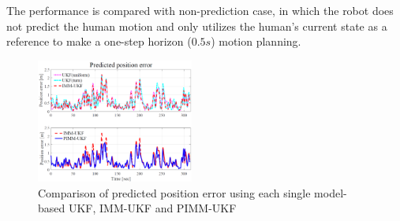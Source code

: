 \documentclass[journal]{IEEEtran}
\begin{document}
	The performance is compared with non-prediction case, in which the robot does not predict the human motion and only utilizes the human's current state as a reference to make a one-step horizon ($0.5s$) motion planning. 
\begin{figure}
		\centering		\includegraphics[width=0.46\textwidth]{figures/prediction_pos_error5}
		\caption{Comparison of predicted position error using each single model-based UKF, IMM-UKF and PIMM-UKF}
		\label{fig:pred}
	\end{figure}
\end{document}
